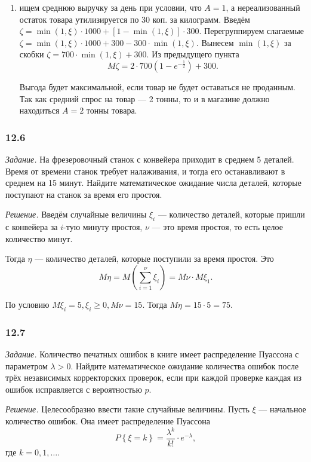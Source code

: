 \begin{enumerate}[label=\alph*)]
\item ищем среднюю выручку за день при условии, что $A = 1$, а нереализованный остаток товара утилизируется по 30 коп. за килограмм.
Введём $ \zeta = \min \left( 1, \xi \right) \cdot 1000 + \left[ 1 - \min \left( 1, \xi \right) \right] \cdot 300$.
Перегруппируем слагаемые $ \zeta = \min \left( 1, \xi \right) \cdot 1000 + 300 - 300 \cdot \min \left( 1, \xi \right) $.
Вынесем $ \min \left( 1, \xi \right) $ за скобки $ \zeta = 700 \cdot \min \left( 1, \xi \right) + 300$.
Из предыдущего пункта
$$M \zeta =
2 \cdot 700 \left( 1 - e^{- \frac{1}{2}} \right) + 300.$$

Выгода будет максимальной, если товар не будет оставаться не проданным.
Так как средний спрос на товар --- 2 тонны, то и в магазине должно находиться $A = 2$ тонны товара.
\end{enumerate}

\subsubsection*{12.6}

\textit{Задание.} На фрезеровочный станок с конвейера приходит в среднем 5 деталей.
Время от времени станок требует налаживания, и тогда его останавливают в среднем на 15 минут.
Найдите математическое ожидание числа деталей, которые поступают на станок за время его простоя.

\textit{Решение.}
Введём случайные величины $ \xi_i$ --- количество деталей,
которые пришли с конвейера за $i$-тую минуту простоя, $ \nu $ --- это время простоя, то есть целое количество минут.

Тогда $ \eta $ --- количество деталей, которые поступили за время простоя.
Это
$$M \eta =
M \left( \sum \limits_{i=1}^{ \nu } \xi_i \right) =
M \nu \cdot M \xi_1.$$

По условию $M \xi_i = 5, \xi_i \geq 0, M \nu = 15$.
Тогда $M \eta = 15 \cdot 5 = 75$.

\subsubsection*{12.7}

\textit{Задание.} Количество печатных ошибок в книге имеет распределение Пуассона с параметром $ \lambda > 0$.
Найдите математическое ожидание количества ошибок после трёх независимых корректорских проверок, если при каждой проверке каждая из ошибок исправляется с вероятностью $p$.

\textit{Решение.} Целесообразно ввести такие случайные величины.
Пусть $ \xi $ --- начальное количество ошибок.
Она имеет распределение Пуассона
$$P \left\{ \xi = k \right\} =
\frac{ \lambda^k}{k!} \cdot e^{- \lambda },$$
где $k = 0, 1, \dotsc $.

